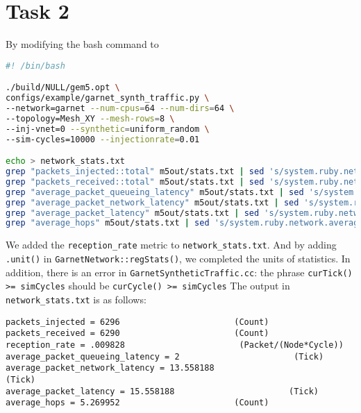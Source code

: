 \documentclass{article}
\begin{document}
\section*{Task 2}
By modifying the bash command to
\begin{lstlisting}[language=bash]
#! /bin/bash

./build/NULL/gem5.opt \
configs/example/garnet_synth_traffic.py \
--network=garnet --num-cpus=64 --num-dirs=64 \
--topology=Mesh_XY --mesh-rows=8 \
--inj-vnet=0 --synthetic=uniform_random \
--sim-cycles=10000 --injectionrate=0.01

echo > network_stats.txt
grep "packets_injected::total" m5out/stats.txt | sed 's/system.ruby.network.packets_injected::total\s*/packets_injected = /' >> network_stats.txt
grep "packets_received::total" m5out/stats.txt | sed 's/system.ruby.network.packets_received::total\s*/packets_received = /' >> network_stats.txt
grep "average_packet_queueing_latency" m5out/stats.txt | sed 's/system.ruby.network.average_packet_queueing_latency\s*/average_packet_queueing_latency = /' >> network_stats.txt
grep "average_packet_network_latency" m5out/stats.txt | sed 's/system.ruby.network.average_packet_network_latency\s*/average_packet_network_latency = /' >> network_stats.txt
grep "average_packet_latency" m5out/stats.txt | sed 's/system.ruby.network.average_packet_latency\s*/average_packet_latency = /' >> network_stats.txt
grep "average_hops" m5out/stats.txt | sed 's/system.ruby.network.average_hops\s*/average_hops = /' >> network_stats.txt
\end{lstlisting}
We added the \verb|reception_rate| metric to \verb|network_stats.txt|. And by adding \verb|.unit()| in \verb|GarnetNetwork::regStats()|, we completed the units of statistics. In addition, there is an error in \verb|GarnetSyntheticTraffic.cc|: the phrase \verb|curTick() >= simCycles| should be \verb|curCycle() >= simCycles| The output in \verb|network_stats.txt| is as follows:
\begin{lstlisting}[language={}]
packets_injected = 6296                       (Count)
packets_received = 6290                       (Count)
reception_rate = .009828                       (Packet/(Node*Cycle))
average_packet_queueing_latency = 2                       (Tick)
average_packet_network_latency = 13.558188                       (Tick)
average_packet_latency = 15.558188                       (Tick)
average_hops = 5.269952                       (Count)
\end{lstlisting}
\end{document}
